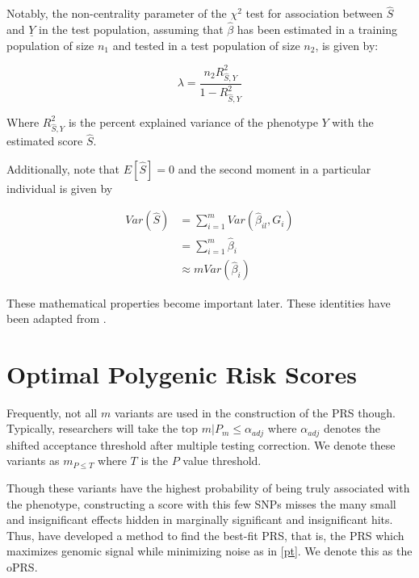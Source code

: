 Notably, the non-centrality parameter of the $\chi^2$ test for association between $\hat{S}$ and $\underline{Y}$ in the test population, assuming that $\hat{\beta}$ has been estimated in a training population of size $n_1$ and tested in a test population of size $n_2$, is given by:

$$ \lambda = \frac{n_2 R^2_{\hat{S}, Y}}{1 - R^2_{\hat{S}, Y}} $$

Where $R^2_{\hat{S}, Y}$ is the percent explained variance of the phenotype $Y$ with the estimated score $\hat{S}$. 

Additionally, note that $E[\hat{S}] = 0$ and the second moment in a particular individual is given by

$$ \begin{aligned} Var(\hat{S}) &= \sum^m_{i=1} Var(\hat{\beta}_{il}, G_{i}) \\ &= \sum^m_{i=1} \hat{\beta}_{i} \\ &\approx m Var(\hat{\beta}_{i}) \end{aligned} $$

These mathematical properties become important later. These identities have been adapted from \cite{Dudbridge2013}.

\section{Optimal Polygenic Risk Scores}
\label{oPRS}

Frequently, not all $m$ variants are used in the construction of the \ac{PRS} though. Typically, researchers will take the top $m | P_m \leq \alpha_{adj}$ where $\alpha_{adj}$ denotes the shifted acceptance threshold after multiple testing correction. We denote these variants as $m_{P \leq T}$ where $T$ is the $P$ value threshold. 

Though these variants have the highest probability of being truly associated with the phenotype, constructing a score with this few \acp{SNP} misses the many small and insignificant effects hidden in marginally significant and insignificant hits. Thus, \cite{Euesden2014} have developed a method to find the best-fit \ac{PRS}, that is, the PRS which maximizes genomic signal while minimizing noise as in \ref{pt}. We denote this as the \ac{oPRS}. 

